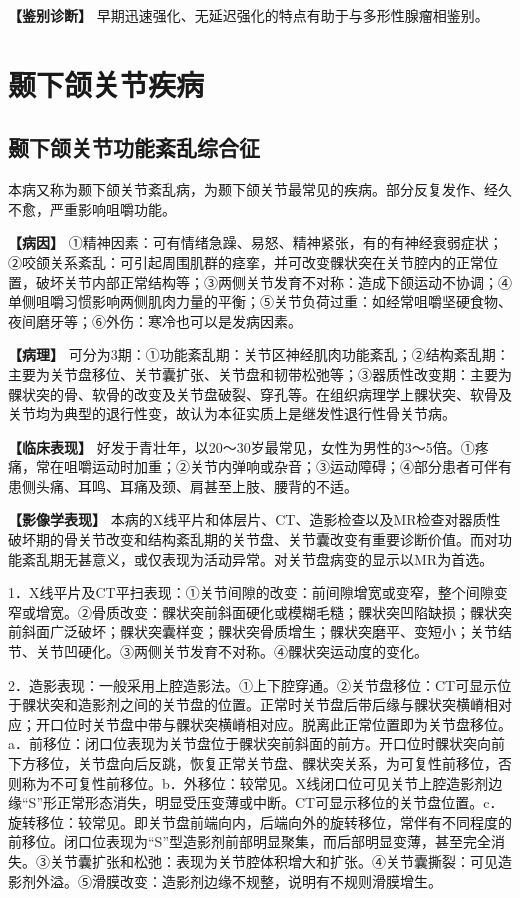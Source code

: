 \textbf{【鉴别诊断】}
早期迅速强化、无延迟强化的特点有助于与多形性腺瘤相鉴别。

\section{颞下颌关节疾病}

\subsection{颞下颌关节功能紊乱综合征}

本病又称为颞下颌关节紊乱病，为颞下颌关节最常见的疾病。部分反复发作、经久不愈，严重影响咀嚼功能。

\textbf{【病因】}
①精神因素：可有情绪急躁、易怒、精神紧张，有的有神经衰弱症状；②咬颌关系紊乱：可引起周围肌群的痉挛，并可改变髁状突在关节腔内的正常位置，破坏关节内部正常结构等；③两侧关节发育不对称：造成下颌运动不协调；④单侧咀嚼习惯影响两侧肌肉力量的平衡；⑤关节负荷过重：如经常咀嚼坚硬食物、夜间磨牙等；⑥外伤：寒冷也可以是发病因素。

\textbf{【病理】}
可分为3期：①功能紊乱期：关节区神经肌肉功能紊乱；②结构紊乱期：主要为关节盘移位、关节囊扩张、关节盘和韧带松弛等；③器质性改变期：主要为髁状突的骨、软骨的改变及关节盘破裂、穿孔等。在组织病理学上髁状突、软骨及关节均为典型的退行性变，故认为本征实质上是继发性退行性骨关节病。

\textbf{【临床表现】}
好发于青壮年，以20～30岁最常见，女性为男性的3～5倍。①疼痛，常在咀嚼运动时加重；②关节内弹响或杂音；③运动障碍；④部分患者可伴有患侧头痛、耳鸣、耳痛及颈、肩甚至上肢、腰背的不适。

\textbf{【影像学表现】}
本病的X线平片和体层片、CT、造影检查以及MR检查对器质性破坏期的骨关节改变和结构紊乱期的关节盘、关节囊改变有重要诊断价值。而对功能紊乱期无甚意义，或仅表现为活动异常。对关节盘病变的显示以MR为首选。

1．X线平片及CT平扫表现：①关节间隙的改变：前间隙增宽或变窄，整个间隙变窄或增宽。②骨质改变：髁状突前斜面硬化或模糊毛糙；髁状突凹陷缺损；髁状突前斜面广泛破坏；髁状突囊样变；髁状突骨质增生；髁状突磨平、变短小；关节结节、关节凹硬化。③两侧关节发育不对称。④髁状突运动度的变化。

2．造影表现：一般采用上腔造影法。①上下腔穿通。②关节盘移位：CT可显示位于髁状突和造影剂之间的关节盘的位置。正常时关节盘后带后缘与髁状突横嵴相对应；开口位时关节盘中带与髁状突横嵴相对应。脱离此正常位置即为关节盘移位。a．前移位：闭口位表现为关节盘位于髁状突前斜面的前方。开口位时髁状突向前下方移位，关节盘向后反跳，恢复正常关节盘、髁状突关系，为可复性前移位，否则称为不可复性前移位。b．外移位：较常见。X线闭口位可见关节上腔造影剂边缘“S”形正常形态消失，明显受压变薄或中断。CT可显示移位的关节盘位置。c．旋转移位：较常见。即关节盘前端向内，后端向外的旋转移位，常伴有不同程度的前移位。闭口位表现为“S”型造影剂前部明显聚集，而后部明显变薄，甚至完全消失。③关节囊扩张和松弛：表现为关节腔体积增大和扩张。④关节囊撕裂：可见造影剂外溢。⑤滑膜改变：造影剂边缘不规整，说明有不规则滑膜增生。

